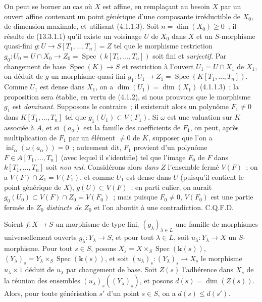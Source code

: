 On peut se borner au cas où $X$ est affine, en remplaçant au besoin $X$ par un
ouvert affine contenant un point générique d'une composante irréductible de $X_0$,
de dimension maximale, et utilisant (4.1.1.3). Soit $n=\dim(X_0)\geq 0$~; il résulte
de (13.3.1.1) qu'il existe un voisinage $U$ de $X_0$ dans $X$ et un $S$-morphisme
quasi-fini
$g:U\to S[T_1,\ldots,T_n]=Z$
tel que le morphisme restriction
$g_0:U_0=U\cap X_0\to Z_0=\operatorname{Spec}(k[T_1,\ldots,T_n])$ soit fini et
\emph{surjectif}. Par changement de base $\operatorname{Spec}(K)\to S$ et restriction
à l'ouvert $U_1=U\cap X_1$ de $X_1$, on déduit de $g$ un morphisme quasi-fini
$g_1:U_1\to Z_1=\operatorname{Spec}(K[T_1,\ldots,T_n])$. Comme $U_1$ est dense dans
$X_1$, on a $\dim(U_1)=\dim(X_1)$ (4.1.1.3)~; la proposition sera établie, en vertu
de (4.1.2), si nous prouvons que le morphisme $g_1$ est \emph{dominant}. Supposons
le contraire~; il existerait alors un polynôme $F_1\ne 0$ dans
$K[T_1,\ldots,T_n]$ tel que $g_1(U_1)\subset V(F_1)$. Si $\omega$ est une valuation
sur $K$ associée à $A$, et si $(a_\alpha)$ est la famille des coefficients de $F_1$,
on peut, après multiplication de $F_1$ par un élément $\ne 0$ de $K$, supposer que
l'on a $\inf_\alpha(\omega(a_\alpha))=0$~; autrement dit, $F_1$ provient d'un
polynôme $F\in A[T_1,\ldots,T_n]$ (avec lequel il s'identifie) tel que l'image $F_0$
de $F$ dans $k[T_1,\ldots,T_n]$ soit \emph{non nul}. Considérons alors \emph{dans} $Z$
l'ensemble fermé $V(F)$~; on a $V(F)\cap Z_1=V(F_1)$, et comme $U_1$ est dense
dans $U$ (puisqu'il contient le point générique de $X$), $g(U)\subset V(F)$~; en
parti%
culier, on aurait $g_0(U_0)\subset V(F)\cap Z_0=V(F_0)$~; mais puisque
$F_0\ne 0$, $V(F_0)$ est une partie fermée de $Z_0$ \emph{distincte de $Z_0$} et
l'on aboutit à une contradiction. C.Q.F.D.

\begin{proposition}[14.3.11]
\label{IV.14.3.11-fr}
Soient $f:X\to S$ un morphisme de type fini, $(g_\lambda)_{\lambda\in L}$ une
famille de morphismes universellement ouverts $g_\lambda:Y_\lambda\to S$, et pour
tout $\lambda\in L$, soit $u_\lambda:Y_\lambda\to X$ un $S$-morphisme. Pour tout
$s\in S$, posons $X_s=X\times_S\operatorname{Spec}(\boldsymbol{k}(s))$,
$(Y_\lambda)_s=Y_\lambda\times_S\operatorname{Spec}(\boldsymbol{k}(s))$, et soit
$(u_\lambda)_s:(Y_\lambda)_s\to X_s$ le morphisme $u_\lambda\times 1$ déduit de
$u_\lambda$ par changement de base. Soit $Z(s)$ l'adhérence dans $X_s$ de la
réunion des ensembles $(u_\lambda)_s((Y_\lambda)_s)$, et posons
$d(s)=\dim(Z(s))$. Alors, pour toute générisation $s'$ d'un point $s\in S$, on a
$d(s)\leq d(s')$.
\end{proposition}

